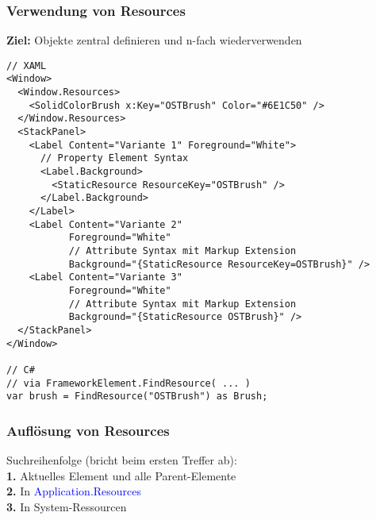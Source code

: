 \subsubsection{Verwendung von Resources}
\textbf{Ziel:} Objekte zentral definieren und n-fach wiederverwenden
\begin{lstlisting}
// XAML
<Window>
  <Window.Resources>
    <SolidColorBrush x:Key="OSTBrush" Color="#6E1C50" />
  </Window.Resources>
  <StackPanel>
    <Label Content="Variante 1" Foreground="White">
      // Property Element Syntax
      <Label.Background>
        <StaticResource ResourceKey="OSTBrush" />
      </Label.Background>
    </Label>
    <Label Content="Variante 2"
           Foreground="White"
           // Attribute Syntax mit Markup Extension
           Background="{StaticResource ResourceKey=OSTBrush}" />
    <Label Content="Variante 3"
           Foreground="White"
           // Attribute Syntax mit Markup Extension
           Background="{StaticResource OSTBrush}" />
  </StackPanel>
</Window>

// C#
// via FrameworkElement.FindResource( ... )
var brush = FindResource("OSTBrush") as Brush;
\end{lstlisting}
\subsubsection{Auflösung von Resources}
Suchreihenfolge (bricht beim ersten Treffer ab):\\
\textbf{1.} Aktuelles Element und alle Parent-Elemente\\
\textbf{2.} In \textcolor{blue}{Application.Resources}\\
\textbf{3.} In System-Ressourcen\\

